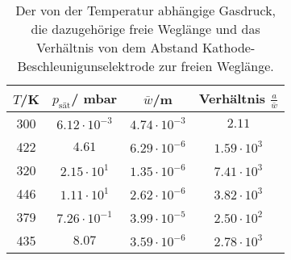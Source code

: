 \begin{table}[H]
  \centering
   \begin{tabular}{c c c c }
    \toprule
    $T$/K & $p_{\text{sät}}$/\; mbar & $\bar{w}$/m & Verhältnis $\frac{a}{\bar{w}}$ \\
    \midrule
    300  & $ 6.12 \cdot 10^{-3}$ & $4.74 \cdot 10^{-3}$ & $2.11$\\
    422 & $ 4.61$                & $6.29 \cdot 10^{-6}$ & $1.59 \cdot 10^{3}$\\
    320 & $ 2.15 \cdot 10^{1}$ & $1.35 \cdot 10^{-6}$ & $7.41 \cdot 10^{3}$\\
    446 & $ 1.11 \cdot 10^{1}$ & $2.62 \cdot 10^{-6}$ & $3.82 \cdot 10^{3}$\\
    379 & $ 7.26 \cdot 10^{-1}$ & $3.99 \cdot 10^{-5}$ & $2.50\cdot 10^{2}$\\
    435 & $ 8.07 $              & $3.59 \cdot 10^{-6}$ & $2.78 \cdot 10^{3}$\\
    \bottomrule
  \end{tabular}
  \caption{Der von der Temperatur abhängige Gasdruck, die dazugehörige freie Weglänge
          und das Verhältnis von dem Abstand Kathode-Beschleunigunselektrode zur freien Weglänge.}
  \label{tab:tab1}
\end{table}
